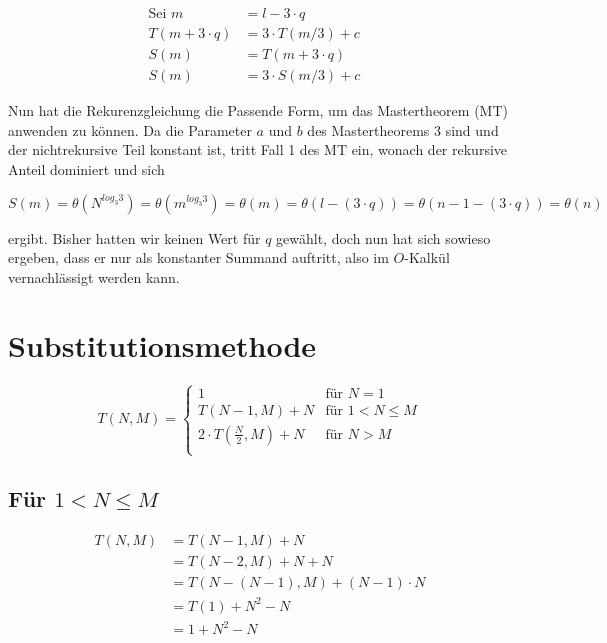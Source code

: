 \documentclass[parskip=half,a4paper]{scrartcl}
\begin{document}
\begin{equation*}
\begin{aligned}
\text{Sei $m$} & = l - 3 \cdot q &\\
T(m + 3 \cdot q) &= 3 \cdot T(m / 3) + c  \\
S(m) & = T(m + 3 \cdot q) \\
S(m) & = 3 \cdot S(m / 3) + c
\end{aligned}
\end{equation*}

Nun hat die Rekurenzgleichung die Passende Form, um das Mastertheorem (MT)
anwenden zu können. Da die Parameter $a$ und $b$ des Mastertheorems 3 sind und der
nichtrekursive Teil konstant ist, tritt Fall 1 des MT ein, wonach der rekursive
Anteil dominiert und sich

$$
S(m) = \theta(N^{log_3{3}})= \theta(m^{log_3{3}}) = \theta(m) = \theta(l - (3 \cdot q)) = \theta(n - 1 - (3 \cdot q)) = \theta(n)
$$

ergibt. Bisher hatten wir keinen Wert für $q$ gewählt, doch nun hat sich sowieso ergeben, dass er nur als konstanter Summand auftritt, also im $O$-Kalkül vernachlässigt werden kann.


\section*{Substitutionsmethode}

\begin{equation*}
    T(N, M) =
\begin{cases}
    1 & \text{für $N = 1$}\\
    T(N-1, M) + N & \text{für $1 < N \le M$} \\
    2 \cdot T(\frac{N}{2}, M) + N & \text{für $N > M$} \\
\end{cases}
\end{equation*}

\subsection*{Für $1 < N \le M$}


\begin{equation*}
\begin{aligned}
    T(N, M) & =  T(N-1, M) + N\\
& = T(N-2, M) + N + N\\
& = T(N-(N-1), M) + (N-1) \cdot N\\
& = T(1) + N^2 - N\\
& = 1 + N^2 - N\\
\end{aligned}
\end{equation*}
\end{document}
